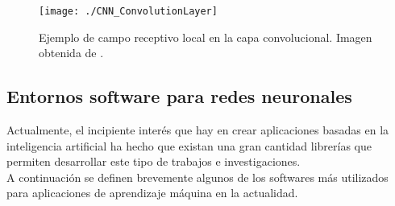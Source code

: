 \documentclass[a4paper, 12pt, oneside]{book}
\begin{document}
\begin{figure}[H]
\begin{center}
\texttt{[image: ./CNN\_ConvolutionLayer]}
\caption{Ejemplo de campo receptivo local en la capa convolucional. Imagen obtenida de \cite{CNN}.}
\label{CNN_ConvolutionLayer}
\end{center}
\end{figure}

\subsection{Entornos software para redes neuronales}\label{SoftwaresRNN}

Actualmente, el incipiente interés que hay en crear aplicaciones basadas en la inteligencia artificial ha hecho que existan una gran cantidad librerías que permiten desarrollar este tipo de trabajos e investigaciones.\\

A continuación se definen brevemente algunos de los softwares más utilizados para aplicaciones de aprendizaje máquina en la actualidad.
\end{document}
